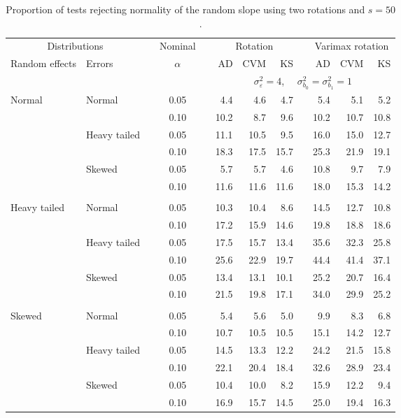 \begin{table}[ht]
\centering
\caption{\label{tab:fixedsimb150} Proportion of tests rejecting normality of the random slope using two rotations and $s = 50$.}
\begin{scriptsize}
\begin{tabular}{ll p{.1cm} c p{.1cm} rrr p{.1cm} rrr}
  \hline
  \multicolumn{2}{c}{Distributions}& & Nominal & &  \multicolumn{3}{c}{Rotation} & & \multicolumn{3}{c}{Varimax rotation} \\ \cline{1-2} \cline{6-8} \cline{10-12}   
  Random effects & Errors & & $\alpha$ & & AD & CVM & KS & & AD & CVM & KS \\ 
   \hline
& && && \multicolumn{7}{c}{$\sigma_{\varepsilon}^2 = 4$, \ \ $\sigma_{b_0}^2 = \sigma_{b_1}^2 = 1$} \\ \cline{6-12}
\rowcolor{gray!20} Normal & Normal &  & 0.05 &  & 4.4 & 4.6 & 4.7 &  & 5.4 & 5.1 & 5.2 \\ 
\rowcolor{gray!20}    &  &  & 0.10 &  & 10.2 & 8.7 & 9.6 &  & 10.2 & 10.7 & 10.8 \\ 
\rowcolor{gray!20}    & Heavy tailed &  & 0.05 &  & 11.1 & 10.5 & 9.5 &  & 16.0 & 15.0 & 12.7 \\ 
\rowcolor{gray!20}    &  &  & 0.10 &  & 18.3 & 17.5 & 15.7 &  & 25.3 & 21.9 & 19.1 \\ 
\rowcolor{gray!20}    & Skewed &  & 0.05 &  & 5.7 & 5.7 & 4.6 &  & 10.8 & 9.7 & 7.9 \\ 
\rowcolor{gray!20}    &  &  & 0.10 &  & 11.6 & 11.6 & 11.6 &  & 18.0 & 15.3 & 14.2 \\ 
&&&&&&&&&&&\\
  Heavy tailed & Normal &  & 0.05 &  & 10.3 & 10.4 & 8.6 &  & 14.5 & 12.7 & 10.8 \\ 
   &  &  & 0.10 &  & 17.2 & 15.9 & 14.6 &  & 19.8 & 18.8 & 18.6 \\ 
   & Heavy tailed &  & 0.05 &  & 17.5 & 15.7 & 13.4 &  & 35.6 & 32.3 & 25.8 \\ 
   &  &  & 0.10 &  & 25.6 & 22.9 & 19.7 &  & 44.4 & 41.4 & 37.1 \\ 
   & Skewed &  & 0.05 &  & 13.4 & 13.1 & 10.1 &  & 25.2 & 20.7 & 16.4 \\ 
   &  &  & 0.10 &  & 21.5 & 19.8 & 17.1 &  & 34.0 & 29.9 & 25.2 \\ 
&&&&&&&&&&&\\
  Skewed & Normal &  & 0.05 &  & 5.4 & 5.6 & 5.0 &  & 9.9 & 8.3 & 6.8 \\ 
   &  &  & 0.10 &  & 10.7 & 10.5 & 10.5 &  & 15.1 & 14.2 & 12.7 \\ 
   & Heavy tailed &  & 0.05 &  & 14.5 & 13.3 & 12.2 &  & 24.2 & 21.5 & 15.8 \\ 
   &  &  & 0.10 &  & 22.1 & 20.4 & 18.4 &  & 32.6 & 28.9 & 23.4 \\ 
   & Skewed &  & 0.05 &  & 10.4 & 10.0 & 8.2 &  & 15.9 & 12.2 & 9.4 \\ 
   &  &  & 0.10 &  & 16.9 & 15.7 & 14.5 &  & 25.0 & 19.4 & 16.3 \\ 


\end{tabular}
\end{scriptsize}
\end{table}

